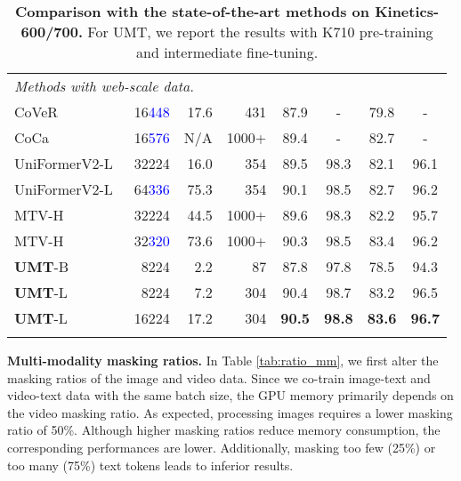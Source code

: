 \documentclass[10pt,twocolumn,letterpaper]{article}
\def\Modelnamelight{UMT}
\def\Modelname{\textbf{UMT}}
\newcommand{\blue}[1]{\textcolor{blue}{#1}}
\begin{document}
\begin{table}[tp]
{\begin{tabular}{l|r|r|r|cc|cc}
        \multicolumn{8}{l}{\textit{Methods with web-scale data.}} \\
        CoVeR~\cite{cover} & 16\blue{448} & 17.6 & 431 & 87.9 & - & 79.8 & - \\
        CoCa~\cite{coca} & 16\blue{576} & N/A & 1000+ & 89.4 & - & 82.7 & - \\
        \scriptsize{UniFormerV2-L}~\cite{uniformerv2} & 32224 & 16.0 & 354 & 89.5 & 98.3 & 82.1 & 96.1 \\
        \scriptsize{UniFormerV2-L}~\cite{uniformerv2} & 64\blue{336} & 75.3 & 354 & 90.1 & 98.5 & 82.7 & 96.2 \\
        MTV-H~\cite{mtv} & 32224 & 44.5 & 1000+  & 89.6 & 98.3 & 82.2 & 95.7 \\
        MTV-H~\cite{mtv} & 32\blue{320} & 73.6 & 1000+  & 90.3 & 98.5 & 83.4 & 96.2 \\
        \Xhline{0.8pt}
        
        \Modelname-B & 8224 & 2.2 & 87 & 87.8 & 97.8 & 78.5 & 94.3 \\
        \Modelname-L & 8224 & 7.2 & 304 & 90.4 & 98.7 & 83.2 & 96.5 \\
        \Modelname-L & 16224 & 17.2 & 304 & \textbf{90.5} & \textbf{98.8} & \textbf{83.6} & \textbf{96.7} \\
        
        \Xhline{1.0pt}
        \end{tabular}
    }
    \vspace{-0.3cm}
    \caption{\textbf{Comparison with the state-of-the-art methods on Kinetics-600/700.}
    For \Modelnamelight, we report the results with K710 pre-training and intermediate fine-tuning.
    }
    \label{tab:k600_k700}
    \vspace{-0.4cm}
\end{table} 
\textbf{Multi-modality masking ratios.}
In Table \ref{tab:ratio_mm}, 
we first alter the masking ratios of the image and video data.
Since we co-train image-text and video-text data with the same batch size, 
the GPU memory primarily depends on the video masking ratio. 
As expected, 
processing images requires a lower masking ratio of 50\%. 
Although higher masking ratios reduce memory consumption, 
the corresponding performances are lower. 
Additionally, 
masking too few (25\%) or too many (75\%) text tokens leads to inferior results.
\end{document}
